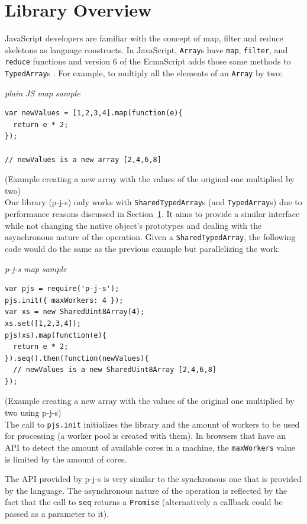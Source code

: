 \documentclass[runningheads,a4paper]{llncs}
\begin{document}
\section{Library Overview}\label{sec:overview}
JavaScript developers are familiar with the concept of map, filter and reduce skeletons as language constructs. In JavaScript, \verb+Array+s have \verb+map+, \verb+filter+, and \verb+reduce+ functions and version 6 of the EcmaScript adds those same methods to \verb+TypedArray+s \cite{es6-ta}. For example, to multiply all the elements of an \verb+Array+ by two:
\medskip

\noindent
{\it plain JS map sample}
\begin{verbatim}
var newValues = [1,2,3,4].map(function(e){
  return e * 2;
});

// newValues is a new array [2,4,6,8]
\end{verbatim}
%
\noindent
{\small (Example creating a new array with the values of the original one multiplied by two)}\\

Our library (p-j-s) only works with \verb+SharedTypedArray+s (and \verb+TypedArray+s) due to performance reasons discussed in Section~\ref{sec:overview}. It aims to provide a similar interface while not changing the native object's prototypes and dealing with the asynchronous nature of the operation. Given a \verb+SharedTypedArray+, the following code would do the same as the previous example but parallelizing the work:
\medskip

\noindent
{\it p-j-s map sample}
\begin{verbatim}
var pjs = require('p-j-s');
pjs.init({ maxWorkers: 4 });
var xs = new SharedUint8Array(4);
xs.set([1,2,3,4]);
pjs(xs).map(function(e){
  return e * 2;
}).seq().then(function(newValues){
  // newValues is a new SharedUint8Array [2,4,6,8]
});
\end{verbatim}
%
\noindent
{\small (Example creating a new array with the values of the original one multiplied by two using p-j-s)}\\

The call to \verb+pjs.init+ initializes the library and the amount of workers to be used for processing (a worker pool is created with them). In browsers that have an API to detect the amount of available cores in a machine, the \verb+maxWorkers+ value is limited by the amount of cores.

The API provided by p-j-s \cite{pjs-api} is very similar to the synchronous one that is provided by the language. The asynchronous nature of the operation is reflected by the fact that the call to \verb+seq+ returns a \verb+Promise+ (alternatively a callback could be passed as a parameter to it).
\end{document}
